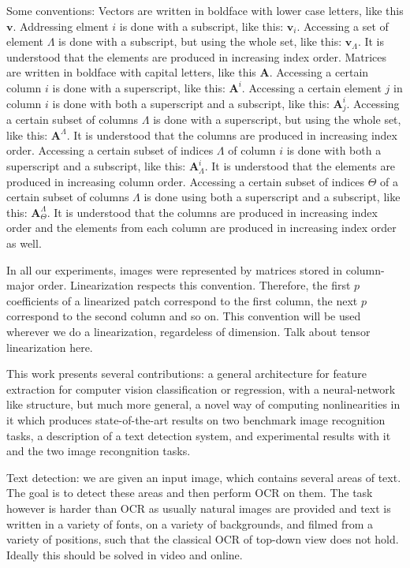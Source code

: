 \documentclass[12pt,a4paper,oneside,english]{UPBThesis}
\begin{document}
Some conventions: Vectors are written in boldface with lower case letters, like this $\textbf{v}$. Addressing elment $i$ is done with a subscript, like this: $\textbf{v}_i$. Accessing a set of element $\Lambda$ is done with a subscript, but using the whole set, like this: $\textbf{v}_\Lambda$. It is understood that the elements are produced in increasing index order. Matrices are written in boldface with capital letters, like this $\textbf{A}$. Accessing a certain column $i$ is done with a superscript, like this: $\textbf{A}^i$. Accessing a certain element $j$ in column $i$ is done with both a superscript and a subscript, like this: $\textbf{A}^i_j$. Accessing a certain subset of columns $\Lambda$ is done with a superscript, but using the whole set, like this: $\textbf{A}^\Lambda$. It is understood that the columns are produced in increasing index order. Accessing a certain subset of indices $\Lambda$ of column $i$ is done with both a superscript and a subscript, like this: $\textbf{A}^i_\Lambda$. It is understood that the elements are produced in increasing column order. Accessing a certain subset of indices $\Theta$ of a certain subset of columns $\Lambda$ is done using both a superscript and a subscript, like this: $\textbf{A}^\Lambda_\Theta$. It is understood that the columns are produced in increasing index order and the elements from each column are produced in increasing index order as well.

In all our experiments, images were represented by matrices stored in column-major order. Linearization respects this convention. Therefore, the first $p$ coefficients of a linearized patch correspond to the first column, the next $p$ correspond to the second column and so on. This convention will be used wherever we do a linearization, regardeless of dimension. Talk about tensor linearization here.

This work presents several contributions: a general architecture for feature extraction for computer vision classification or regression, with a neural-network like structure, but much more general, a novel way of computing nonlinearities in it which produces state-of-the-art results on two benchmark image recognition tasks, a description of a text detection system, and experimental results with it and the two image recongnition tasks.

Text detection: we are given an input image, which contains several areas of text. The goal is to detect these areas and then perform OCR on them. The task however is harder than OCR as usually natural images are provided and text is written in a variety of fonts, on a variety of backgrounds, and filmed from a variety of positions, such that the classical OCR of top-down view does not hold. Ideally this should be solved in video and online.
\end{document}
